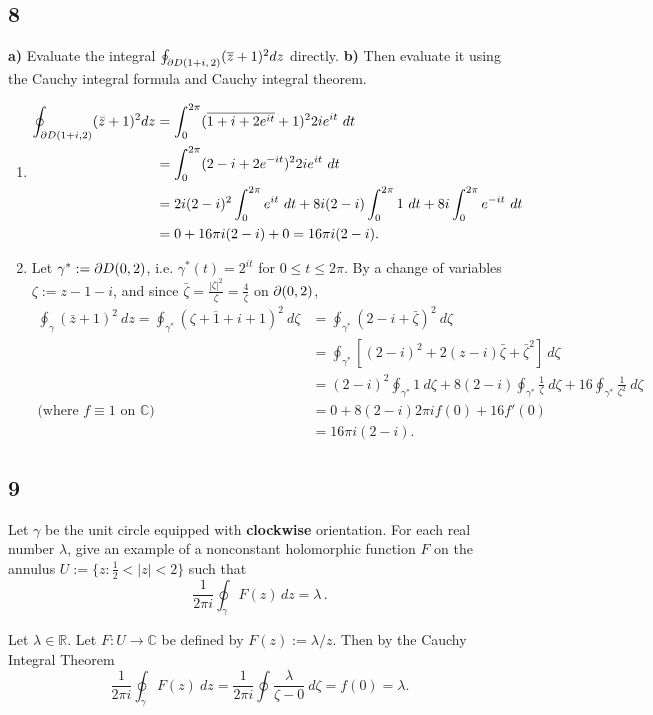 \documentclass[12pt]{article}
\begin{document}
\subsection*{8}
\begin{tcolorbox}
{\bf a)} Evaluate the integral $\oint_{\partial
D(1+i,\,2)}(\overline z+1)^{2}dz$ directly. {\bf b)}
Then evaluate it using the Cauchy integral formula and Cauchy integral theorem.
\end{tcolorbox}
\begin{enumerate}[label=(\alph*)]
\item 
\begin{align*}
\oint_{\partial D(1+i,2)}(\bar{z} + 1)^{2}dz & = \int_{0}^{2\pi}(\overline{1 + i + 2e^{it}} + 1)^{2}2ie^{it}\ dt \\
& = \int_{0}^{2\pi}(2-i + 2e^{-it})^{2}2ie^{it}\ dt \\
& = 2i(2-i)^2\int_{0}^{2\pi}e^{it}\ dt + 8i(2-i)\int_{0}^{2\pi}1\ dt + 8i \int_{0}^{2\pi}e^{-it}\ dt \\
& = 0 + 16\pi i(2-i) + 0 = 16\pi i(2-i).
\end{align*}
\item Let $\gamma^* := \partial D(0,2)$, i.e. $\gamma^{*}(t) = 2^{it}$ for $0 \leq t \leq 2\pi$. By a change of variables $\zeta := z - 1 - i$, and 
since $\bar{\zeta} = \frac{|\zeta|^2}{\zeta} = \frac{4}{\zeta}$ on $\partial (0,2)$,
\begin{align*}
\oint_{\gamma}(\bar{z} + 1)^{2}\ dz = \oint_{\gamma^*}(\overline{\zeta + 1 + i} + 1)^2\ d\zeta & = \oint_{\gamma^*}(2 - i + \bar{\zeta})^2\ d\zeta \\
& = \oint_{\gamma^*}[(2-i)^2 + 2(z-i)\bar{\zeta} + \bar{\zeta}^2]\ d\zeta \\
& = (2-i)^2 \oint_{\gamma^*}1\ d\zeta + 8(2-i)\oint_{\gamma^*}\frac{1}{\zeta}\ d\zeta + 16\oint_{\gamma^*}\frac{1}{\zeta^2}\ d\zeta \\
\text{(where $f \equiv 1$ on $\mathbb{C}$) }\ \  & = 0 + 8(2-i)2\pi i f(0) + 16 f'(0) \\
& = 16\pi i(2-i).
\end{align*}
\end{enumerate}

\subsection*{9}
\begin{tcolorbox}Let $\gamma$ be the unit circle equipped with {\bf clockwise}
orientation. For each real number $\lambda$, give an example of a
nonconstant holomorphic function $F$ on the annulus
$U := \{z:\frac12<|z|<2\}$ such that $$\dfrac{1}{2\pi
i}\oint_{\gamma}F(z)\,dz=\lambda\,.$$
\end{tcolorbox}
Let $\lambda \in \mathbb{R}$. Let $F : U \rightarrow \mathbb{C}$ be defined by $F(z) := \lambda / z$. Then by the Cauchy Integral Theorem
\[ \frac{1}{2\pi i}\oint_{\gamma}F(z)\ dz = \frac{1}{2\pi i}\oint \frac{\lambda}{\zeta - 0}\ d\zeta = f(0) = \lambda. \]
\end{document}
